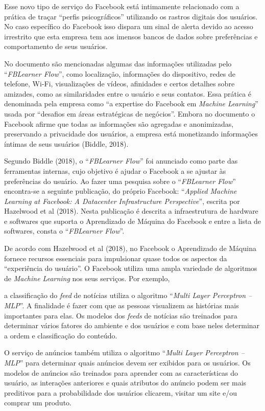Esse novo tipo de serviço do Facebook está intimamente relacionado com a
prática de traçar ``perfis psicográficos'' utilizando os rastros
digitais dos usuários. No caso específico do Facebook isso dispara um
sinal de alerta devido ao acesso irrestrito que esta empresa tem aos
imensos bancos de dados sobre preferências e comportamento de seus
usuários.

No documento são mencionadas algumas das informações utilizadas pelo
``\emph{FBLearner Flow}'', como localização, informações do dispositivo,
redes de telefone, Wi-Fi, visualizações de vídeos, afinidades e certos
detalhes sobre amizades, como as similaridades entre o usuário e seus
contatos. Essa prática é denominada pela empresa como ``a expertise do
Facebook em \emph{Machine Learning}'' usada por ``desafios em áreas
estratégicas de negócios''. Embora no documento o Facebook afirme que
todas as informações são agregadas e anonimizadas, preservando a
privacidade dos usuários, a empresa está monetizando informações íntimas
de seus usuários (Biddle, 2018).

Segundo Biddle (2018), o ``\emph{FBLearner Flow}'' foi anunciado como
parte das ferramentas internas, cujo objetivo é ajudar o Facebook a se
ajustar às preferências do usuário. Ao fazer uma pesquisa sobre o
``\emph{FBLearner Flow}'' encontra-se a seguinte publicação, do próprio
Facebook: ``\emph{Applied Machine Learning at Facebook: A Datacenter
Infrastructure Perspective}'', escrita por Hazelwood et al (2018). Nesta
publicação é descrita a infraestrutura de hardware e softwares que
suporta o Aprendizado de Máquina do Facebook e entre a lista de
softwares, consta o ``\emph{FBLearner Flow}''.

De acordo com Hazelwood et al (2018), no Facebook o Aprendizado de
Máquina fornece recursos essenciais para impulsionar quase todos os
aspectos da ``experiência do usuário''. O Facebook utiliza uma ampla
variedade de algoritmos de \emph{Machine Learning} nos seus serviços.
Por exemplo,

a classificação do \emph{feed} de notícias utiliza o algoritmo
``\emph{Multi Layer Perceptron -- MLP}''. A finalidade é fazer com que
as pessoas visualizem as histórias mais importantes para elas. Os
modelos dos \emph{feeds} de notícias são treinados para determinar
vários fatores do ambiente e dos usuários e com base neles determinar a
ordem e classificação do conteúdo.

O serviço de anúncios também utiliza o algoritmo ``\emph{Multi Layer
Perceptron -- MLP}'' para determinar quais anúncios devem ser exibidos
para os usuários. Os modelos de anúncios são treinados para aprender com
as características do usuário, as interações anteriores e quais
atributos do anúncio podem ser mais preditivos para a probabilidade dos
usuários clicarem, visitar um site e/ou comprar um produto.

